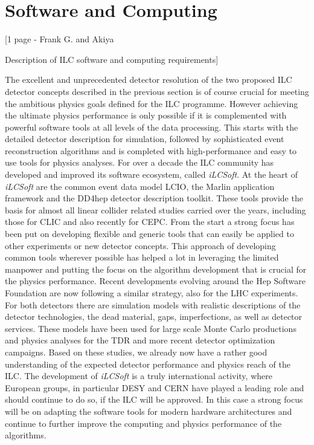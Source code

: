 \documentclass[%
 reprint,
 amsmath,amssymb,
 aps,
]{revtex4-1}
\begin{document}
\section{\label{sec:soft}Software and Computing}

[1 page - Frank G. and Akiya

  Description of ILC software and computing requirements]

The excellent and unprecedented detector resolution of the two proposed ILC detector concepts described
in the previous section is of course crucial for meeting the ambitious physics goals
defined for the ILC programme. However achieving the ultimate physics performance is only possible if it
is complemented with powerful software tools at all levels of the data processing. This starts with the
detailed detector description for simulation, followed by sophisticated event reconstruction algorithms
and is completed with high-performance and easy to use tools for physics analyses.
For over a decade the ILC community has developed and improved its software ecosystem, called \emph{iLCSoft}.
At the heart of \emph{iLCSoft} are the common event data model LCIO, the Marlin application framework and the
DD4hep detector description toolkit. These tools provide the basis for almost all linear collider related
studies carried over the years, including those for CLIC and also recently for CEPC.
From the start a strong focus has been put on developing flexible and generic tools that can easily be applied
to other experiments or new detector concepts. This approach of developing common tools wherever possible
has helped a lot in leveraging the limited manpower and putting the focus on the algorithm development that
is crucial for the physics performance. Recent developments evolving around the Hep Software Foundation are
now following a similar strategy, also for the LHC experiments.
For both detectors there are simulation models with realistic descriptions of the detector technologies,
the dead material, gaps, imperfections, as well as detector services. These models have been used for large
scale Monte Carlo productions and physics analyses for the TDR and more recent detector optimization
campaigns. Based on these studies, we already now have a rather good understanding of the expected
detector performance and physics reach of the ILC.
The development of \emph{iLCSoft} is a truly international activity, where European groups, in particular DESY and
CERN have played a leading role and should continue to do so, if the ILC will be approved. In this case
a strong focus will be on adapting the software tools for modern hardware architectures and continue to
further improve the computing and physics performance of the algorithms.
\end{document}

